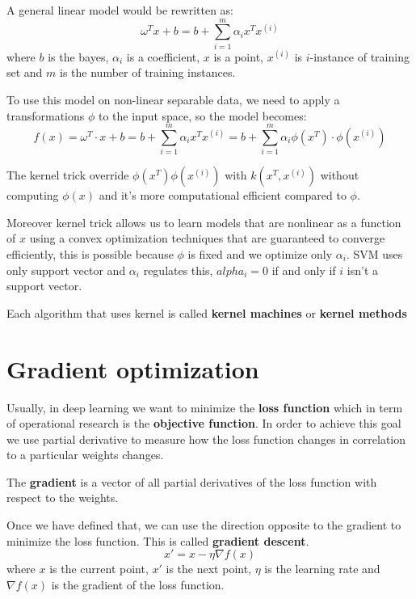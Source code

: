 A general linear model would be rewritten as:
\begin{equation}
    \omega^T x + b = b+ \sum_{i=1}^m \alpha_ix^Tx^{(i)}
\end{equation}
where $b$ is the bayes, $\alpha_i$ is a coefficient, $x$ is a point, $x^(i)$ is
$i$-instance of training set and $m$ is the number of training instances.

To use this model on non-linear separable data, we need to apply a transformations $\phi$
to the input space, so the model becomes:
\begin{equation}
    f(x) = \omega^T \cdot x + b = b + \sum_{i = 1}^m \alpha_ix^Tx^{(i)} = b + \sum_{i=1}^m \alpha_i\phi (x^T) \cdot \phi(x^{(i)})
\end{equation}

The kernel trick override $\phi(x^T)\phi(x^{(i)})$ with $k(x^T, x^(i))$ without
computing $\phi(x)$ and it's more computational efficient compared to $\phi$.

Moreover kernel trick allows us to learn models that are nonlinear as a function
of $x$ using a convex optimization techniques that are guaranteed to converge
efficiently, this is possible because $\phi $ is fixed and we optimize only $\alpha_i$.
SVM uses only support vector and $\alpha_i$ regulates this, $alpha_i= 0$ if and
only if $i$ isn't a support vector.

Each algorithm that uses kernel is called \textbf{kernel machines} or \textbf{kernel
    methods}
\section{Gradient optimization}
Usually, in deep learning we want to minimize the \textbf{loss function} which in
term of operational research is the \textbf{objective function}. In order to
achieve this goal we use partial derivative to measure how the loss function changes
in correlation to a particular weights changes.

The \textbf{gradient} is a vector of all partial derivatives of the loss function
with respect to the weights.

Once we have defined that, we can use the direction opposite to the gradient to
minimize the loss function. This is called \textbf{gradient descent}.
\begin{equation}
    x' = x - \eta \nabla f(x)
\end{equation}
where $x$ is the current point, $x'$ is the next point, $\eta$ is the learning rate
and $\nabla f(x)$ is the gradient of the loss function.

